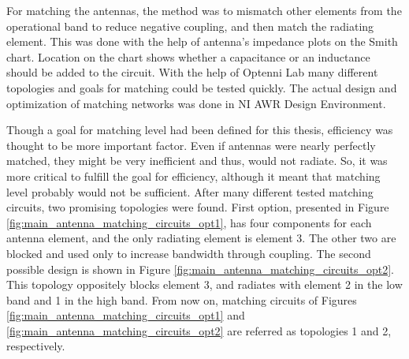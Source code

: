 For matching the antennas, the method was to mismatch other elements from the operational band to reduce negative coupling, and then match the radiating element. This was done with the help of antenna's impedance plots on the Smith chart. Location on the chart shows whether a capacitance or an inductance should be added to the circuit. With the help of Optenni Lab many different topologies and goals for matching could be tested quickly. The actual design and optimization of matching networks was done in NI AWR Design Environment.

Though a goal for matching level had been defined for this thesis, efficiency was thought to be more important factor. Even if antennas were nearly perfectly matched, they might be very inefficient and thus, would not radiate. So, it was more critical to fulfill the goal for efficiency, although it meant that matching level probably would not be sufficient. After many different tested matching circuits, two promising topologies were found. First option, presented in Figure \ref{fig:main_antenna_matching_circuits_opt1}, has four components for each antenna element, and the only radiating element is element 3. The other two are blocked and used only to increase bandwidth through coupling. The second possible design is shown in Figure \ref{fig:main_antenna_matching_circuits_opt2}. This topology oppositely blocks element 3, and radiates with element 2 in the low band and 1 in the high band. From now on, matching circuits of Figures \ref{fig:main_antenna_matching_circuits_opt1} and \ref{fig:main_antenna_matching_circuits_opt2} are referred as topologies 1 and 2, respectively.


